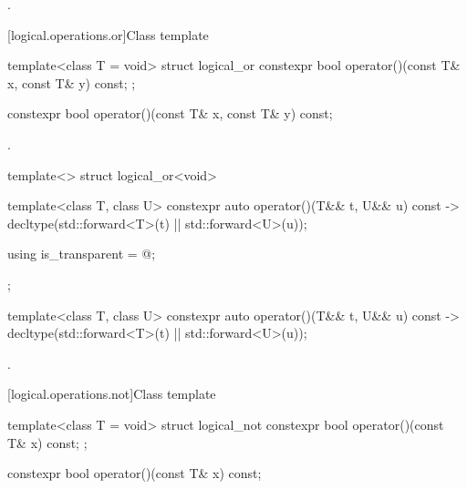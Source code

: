 \begin{itemdescr}
\pnum\returns {}.
\end{itemdescr}

[logical.operations.or]{Class template }

%
\begin{itemdecl}
template<class T = void> struct logical_or {
  constexpr bool operator()(const T& x, const T& y) const;
};
\end{itemdecl}

%
\begin{itemdecl}
constexpr bool operator()(const T& x, const T& y) const;
\end{itemdecl}

\begin{itemdescr}
\pnum\returns {}.
\end{itemdescr}

%
\begin{itemdecl}
template<> struct logical_or<void> {
  template<class T, class U> constexpr auto operator()(T&& t, U&& u) const
    -> decltype(std::forward<T>(t) || std::forward<U>(u));

  using is_transparent = @\unspec@;
};
\end{itemdecl}

%
\begin{itemdecl}
template<class T, class U> constexpr auto operator()(T&& t, U&& u) const
    -> decltype(std::forward<T>(t) || std::forward<U>(u));
\end{itemdecl}

\begin{itemdescr}
\pnum\returns {}.
\end{itemdescr}

[logical.operations.not]{Class template }

%
\begin{itemdecl}
template<class T = void> struct logical_not {
  constexpr bool operator()(const T& x) const;
};
\end{itemdecl}

%
\begin{itemdecl}
constexpr bool operator()(const T& x) const;
\end{itemdecl}

